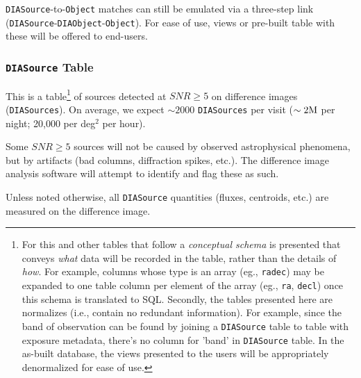 \documentclass[12pt]{article}
\newcommand{\code}[1]{\texttt{#1}}
\newcommand{\DIASource}{\code{DIASource}\xspace}
\newcommand{\DIASources}{\code{DIASources}\xspace}
\newcommand{\DIAObject}{\code{DIAObject}\xspace}
\newcommand{\DIAObjects}{\code{DIAObjects}\xspace}
\newcommand{\DB}{{Level 1 database}\xspace}
\newcommand{\Object}{\code{Object}\xspace}
\newcommand{\SSObject}{\code{SSObject}\xspace}
\begin{document}
\vspace{2ex}
\DIASource-to-\Object matches can still be emulated via a three-step link (\DIASource-\DIAObject-\Object). For ease of use, views or pre-built table with these will be offered to end-users.


\subsubsection{\DIASource Table}

This is a table\footnote{For this and other tables that follow a {\em conceptual schema} is presented that conveys {\em what} data will be recorded in the table, rather than the details of {\em how}. For example, columns whose type is an array (eg., \texttt{radec}) may be expanded to one table column per element of the array (eg., \texttt{ra}, \texttt{decl}) once this schema is translated to SQL. Secondly, the tables presented here are normalizes (i.e., contain no redundant information). For example, since the band of observation can be found by joining a \DIASource table to table with exposure metadata, there's no column for 'band' in \DIASource table. In the as-built database, the views presented to the users will be appropriately denormalized for ease of use.} of sources detected at $SNR \geq 5$ on difference images (\DIASources). On average, we expect $\sim 2000$ \DIASources per visit ($\sim 2{\rm M}$ per night; 20,000 per deg$^2$ per hour).

Some $SNR \geq 5$ sources will not be caused by observed astrophysical phenomena, but by artifacts (bad columns, diffraction spikes, etc.). The difference image analysis software will attempt to identify and flag these as such.

Unless noted otherwise, all \DIASource quantities (fluxes, centroids, etc.) are measured on the difference image.
\end{document}
